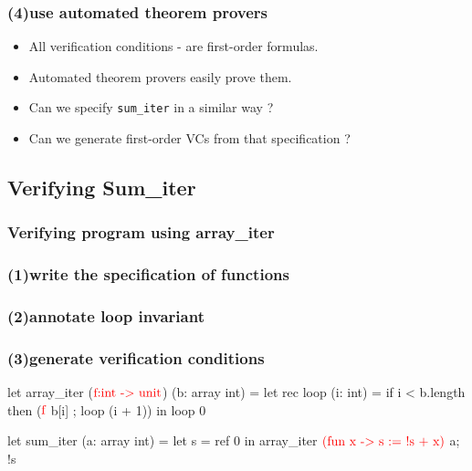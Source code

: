 \begin{frame}
\frametitle{(4)\quad use automated theorem provers}
\begin{itemize}
\item<1-> All verification conditions {\tiny {} - } are first-order formulas.
\item<2-> Automated theorem provers easily prove them.
\item<3-> {\color{red} Can we specify \texttt{sum\_iter} in a similar way ?}
\item<4-> {\color{red} Can we generate first-order VCs from that specification ?}
\end{itemize}
\end{frame}

\subsection*{Verifying Sum_iter}
\begin{frame}[fragile]
\frametitle<1>
{Verifying program using array\_iter}
\frametitle<2>
{(1)\quad write the specification of functions}
\frametitle<3>
{(2)\quad annotate loop invariant}
\frametitle<4-8>
{(3)\quad generate verification conditions}

\begin{footnotesize}
\begin{minipage}[t]{0.3\linewidth}
\begin{whycode}  
   let array_iter ($\textcolor{red}{\text{f:int -> unit}}$) (b: array int)   
   = let rec loop (i: int) =  
       if i < b.length 
       then ($\textcolor{red}{\text{f}}$ b[i] ; loop (i + 1)) 
     in loop 0
   
   let sum_iter (a: array int)
   =  let s = ref 0 in
     array_iter $\textcolor{red}{\text{(fun x -> s := !s + x)}}$ a; 
     !s 
\end{whycode}
\end{minipage}
\end{footnotesize}
\end{frame}

